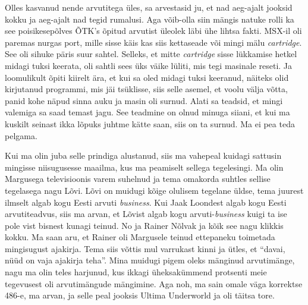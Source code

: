 Olles kasvanud nende arvutitega üles, sa arvestasid ju, et nad aeg-ajalt jooksid kokku ja aeg-ajalt nad tegid rumalusi. Aga võib-olla siin mängis natuke rolli ka see  poisikesepõlves ÕTK's õpitud arvutist üleolek läbi ühe lihtsa fakti. MSX-il oli paremas nurgas port, mille sisse käis kas siis kettaseade või mingi mälu \emph{cartridge}. See oli sihuke päris suur sahtel. Selleks, et mitte \emph{cartridge} sisse lükkamise hetkel midagi tuksi keerata, oli sahtli sees üks väike lüliti, mis tegi masinale reseti. Ja loomulikult õpiti kiirelt ära, et kui sa oled midagi tuksi keeranud, näiteks olid kirjutanud programmi, mis jäi tsüklisse, siis selle asemel, et voolu välja võtta, panid kohe näpud sinna auku ja masin oli surnud. Alati sa teadsid, et mingi valemiga sa saad temast jagu. See teadmine on olnud minuga siiani, et kui ma kuskilt seinast ikka lõpuks juhtme kätte saan, siis on ta surnud. Ma ei pea teda pelgama.


Kui ma olin juba selle prindiga alustanud, siis ma vahepeal kuidagi sattusin mingisse niisugusesse maailma, kus ma peamiselt sellega tegelesingi. Ma olin Margusega televisioonis varem suhelnud ja tema omakorda suhtles sellise tegelasega nagu Lõvi. Lõvi on muidugi kõige olulisem tegelane üldse, tema juurest ilmselt algab kogu Eesti arvuti \emph{business}. Kui Jaak Loondest algab kogu Eesti arvutiteadvus, siis ma arvan, et Lõvist algab kogu arvuti-\emph{business} kuigi ta ise pole vist bisnest kunagi teinud. No ja Rainer Nõlvak ja kõik see nagu klikkis kokku. Ma saan aru, et Rainer oli Margusele teinud ettepaneku toimetada mingisugust ajakirja. Tema siis võttis mul varrukast kinni ja ütles, et \enquote{davai, nüüd on vaja ajakirja teha}. Mina muidugi pigem oleks mänginud arvutimänge, nagu ma olin teles harjunud, kus ikkagi üheksakümmend protsenti meie tegevusest oli arvutimängude mängimine. Aga noh, ma sain omale väga korrektse 486-e, ma arvan, ja selle peal jooksis Ultima Underworld ja oli täitsa tore. 

